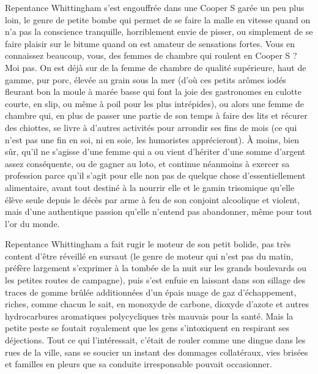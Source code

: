 %
%
%
Repentance Whittingham s’est engouffrée dans une Cooper S garée un peu plus loin, le genre de petite bombe qui permet de se faire la malle en vitesse quand on n’a pas la conscience tranquille, horriblement envie de pisser, ou simplement de se faire plaisir sur le bitume quand on est amateur de sensations fortes. Vous en connaissez beaucoup, vous, des femmes de chambre qui roulent en Cooper S ? Moi pas. On est déjà sur de la femme de chambre de qualité supérieure, haut de gamme, pur porc, élevée au grain sous la mer (d’où ces petits arômes iodés fleurant bon la moule à marée basse qui font la joie des gastronomes en culotte courte, en slip, ou même à poil pour les plus intrépides), ou alors une femme de chambre qui, en plus de passer une partie de son temps à faire des lits et récurer des chiottes, se livre à d’autres activités pour arrondir ses fins de mois (ce qui n’est pas une fin en soi, ni en soie, les humoristes apprécieront). À moins, bien sûr, qu’il ne s’agisse d’une femme qui a ou vient d’hériter d’une somme d’argent assez conséquente, ou de gagner au loto, et continue néanmoins à exercer sa profession parce qu’il s’agit pour elle non pas de quelque chose d’essentiellement alimentaire, avant tout destiné à la nourrir elle et le gamin trisomique qu’elle élève seule depuis le décès par arme à feu de son conjoint alcoolique et violent, mais d’une authentique passion qu’elle n’entend pas abandonner, même pour tout l’or du monde.

Repentance Whittingham a fait rugir le moteur de son petit bolide, pas très content d’être réveillé en sursaut (le genre de moteur qui n’est pas du matin, préfère largement s’exprimer à la tombée de la nuit sur les grands boulevards ou les petites routes de campagne), puis s’est enfuie en laissant dans son sillage des traces de gomme brûlée additionnées d’un épais nuage de gaz d’échappement, riches, comme chacun le sait, en monoxyde de carbone, dioxyde d’azote et autres hydrocarbures aromatiques polycycliques très mauvais pour la santé. Mais la petite peste se foutait royalement que les gens s’intoxiquent en respirant ses déjections. Tout ce qui l’intéressait, c’était de rouler comme une dingue dans les rues de la ville, sans se soucier un instant des dommages collatéraux, vies brisées et familles en pleurs que sa conduite irresponsable pouvait occasionner.


